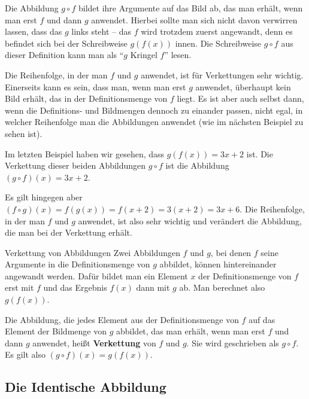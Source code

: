 \documentclass[../../main.tex]{subfiles}
\begin{document}
Die Abbildung $g\circ f$ bildet ihre Argumente auf das Bild ab, das man erhält, wenn man erst $f$ und dann $g$ anwendet. Hierbei sollte man sich nicht davon verwirren lassen, dass das $g$ links steht -- das $f$ wird trotzdem zuerst angewandt, denn es befindet sich bei der Schreibweise $g(f(x))$ innen. Die Schreibweise $g\circ f$ aus dieser Definition kann man als \enquote{$g$ Kringel $f$} lesen.

Die Reihenfolge, in der man $f$ und $g$ anwendet, ist für Verkettungen sehr wichtig. Einerseits kann es sein, dass man, wenn man erst $g$ anwendet, überhaupt kein Bild erhält, das in der Definitionsmenge von $f$ liegt. Es ist aber auch selbst dann, wenn die Definitions- und Bildmengen dennoch zu einander passen, nicht egal, in welcher Reihenfolge man die Abbildungen anwendet (wie im nächsten Beispiel zu sehen ist).

\begin{example}{}
    Im letzten Beispiel haben wir gesehen, dass $g(f(x))=3x+2$ ist. Die Verkettung dieser beiden Abbildungen $g\circ f$ ist die Abbildung $(g\circ f)(x)=3x+2$.
    
    Es gilt hingegen aber $(f\circ g)(x)=f(g(x))=f(x+2)=3(x+2)=3x+6$. Die Reihenfolge, in der man $f$ und $g$ anwendet, ist also sehr wichtig und verändert die Abbildung, die man bei der Verkettung erhält.
\end{example}

\begin{nutshell}{Verkettung von Abbildungen}
    \parpic[r]{}
    Zwei Abbildungen $f$ und $g$, bei denen $f$ seine Argumente in die Definitionsmenge von $g$ abbildet, können hintereinander angewandt werden. Dafür bildet man ein Element $x$ der Definitionsmenge von $f$ erst mit $f$ und das Ergebnis $f(x)$ dann mit $g$ ab. Man berechnet also $g(f(x))$.
      
    Die Abbildung, die jedes Element aus der Definitionsmenge von $f$ auf das Element der Bildmenge von $g$ abbildet, das man erhält, wenn man erst $f$ und dann $g$ anwendet, heißt \textbf{Verkettung} von $f$ und $g$. Sie wird geschrieben als $g\circ f$. Es gilt also $(g\circ f)(x)=g(f(x))$.
\end{nutshell}

\subsection{Die Identische Abbildung}
\label{sec:abbildungen_identitaet}
\end{document}
